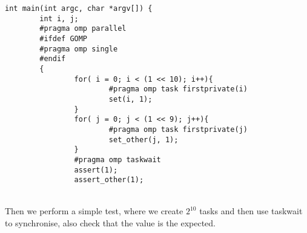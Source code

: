 \begin{lstlisting}[caption=Test initialisation code,label=testinit]
int main(int argc, char *argv[]) {
        int i, j;
        #pragma omp parallel 
        #ifdef GOMP
        #pragma omp single
        #endif
        {
                for( i = 0; i < (1 << 10); i++){
                        #pragma omp task firstprivate(i)
                        set(i, 1);
                }
                for( j = 0; j < (1 << 9); j++){
                        #pragma omp task firstprivate(j)
                        set_other(j, 1);
                }
                #pragma omp taskwait
                assert(1);
                assert_other(1);
\end{lstlisting}
\par ~\\
Then we perform a simple test, where we create $2^{10}$ tasks and then use taskwait to synchronise, also check that the value is the expected.

